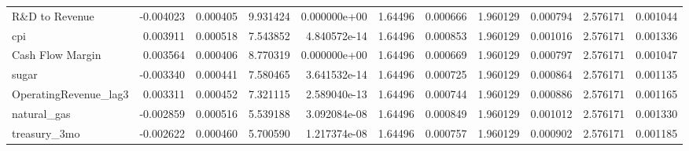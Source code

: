 \documentclass[12pt,a4paper,english]{article}
\begin{document}
{{\begin{tabular}{@{}lrrrrrrrrrr@{}}
			R\&D to Revenue               & -0.004023                & 0.000405                    & 9.931424                  & 0.000000e+00                             & 1.64496                       & 0.000666                      & 1.960129                     & 0.000794                     & 2.576171                     & 0.001044                     \\
			cpi                           & 0.003911                 & 0.000518                    & 7.543852                  & 4.840572e-14                             & 1.64496                       & 0.000853                      & 1.960129                     & 0.001016                     & 2.576171                     & 0.001336                     \\
			Cash Flow Margin              & 0.003564                 & 0.000406                    & 8.770319                  & 0.000000e+00                             & 1.64496                       & 0.000669                      & 1.960129                     & 0.000797                     & 2.576171                     & 0.001047                     \\
			sugar                         & -0.003340                & 0.000441                    & 7.580465                  & 3.641532e-14                             & 1.64496                       & 0.000725                      & 1.960129                     & 0.000864                     & 2.576171                     & 0.001135                     \\
			OperatingRevenue\_lag3        & 0.003311                 & 0.000452                    & 7.321115                  & 2.589040e-13                             & 1.64496                       & 0.000744                      & 1.960129                     & 0.000886                     & 2.576171                     & 0.001165                     \\
			natural\_gas                  & -0.002859                & 0.000516                    & 5.539188                  & 3.092084e-08                             & 1.64496                       & 0.000849                      & 1.960129                     & 0.001012                     & 2.576171                     & 0.001330                     \\
			treasury\_3mo                 & -0.002622                & 0.000460                    & 5.700590                  & 1.217374e-08                             & 1.64496                       & 0.000757                      & 1.960129                     & 0.000902                     & 2.576171                     & 0.001185                     \\

\end{tabular}}}
\end{document}
